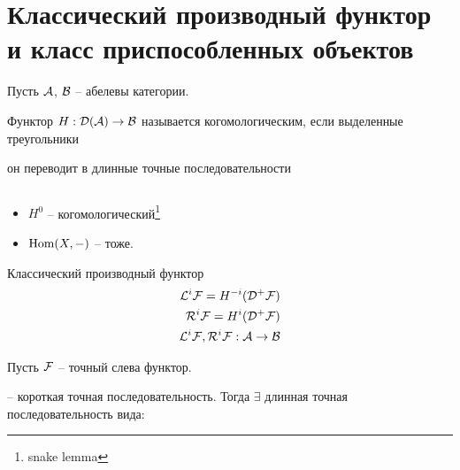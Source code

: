 \documentclass[../main.tex]{subfiles}
\begin{document}
\section{Классический производный функтор и класс приспособленных объектов}
Пусть $\mathcal{A}$, $\mathcal{B}$ -- абелевы категории.
 \begin{to_def}
Функтор $H: \mathcal{D(A)}\rightarrow\mathcal{B}$ называется когомологическим, если выделенные треугольники  он переводит в длинные точные последовательности
\end{to_def}
\begin{to_ex}
$ $
\begin{itemize}
    \item $H^0$ -- когомологический\footnote{snake lemma}
    \item $\operatorname{Hom}(X, -)$ -- тоже.
\end{itemize}
\end{to_ex}
\begin{to_def}
 \label{classicDerFunc}
Классический производный функтор 
\begin{align*}
    \mathcal{L}^{i}\mathcal{F} = H^{-i}(\mathcal{D^+ F})\\
    \mathcal{R}^{i}\mathcal{F} = H^{i}(\mathcal{D^+ F})\\
    \mathcal{L}^{i}\mathcal{F}, \mathcal{R}^{i}\mathcal{F}: \mathcal{A} \rightarrow \mathcal{B}
\end{align*}
\bee
{}
\eee
\end{to_def}
\begin{to_claim}
Пусть $\mathcal{F}$ -- точный слева функтор.  -- короткая точная последовательность. Тогда $\exists$ длинная точная последовательность вида:
\bee
{}
\eee
\end{to_claim}
\end{document}
